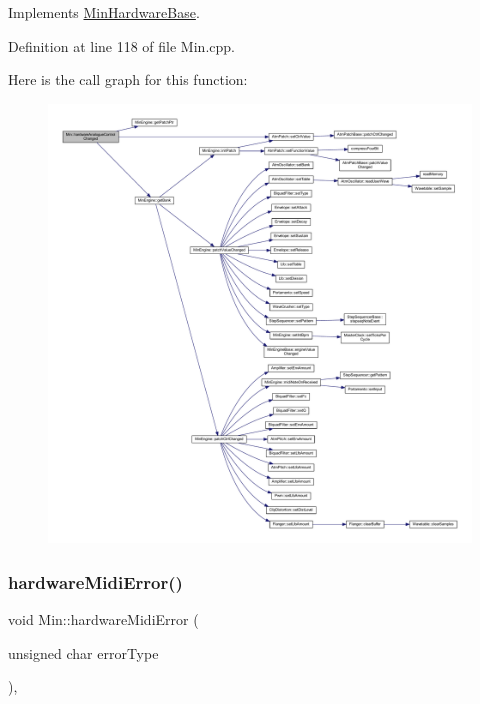 Implements \hyperlink{class_min_hardware_base_a68f71adaa4f8ed5d170fa09820f63871}{Min\+Hardware\+Base}.



Definition at line 118 of file Min.\+cpp.

Here is the call graph for this function\+:
\nopagebreak
\begin{figure}[H]
\begin{center}
\leavevmode
\includegraphics[width=350pt]{class_min_aead3e428133f75538420c1e67c532fa7_cgraph}
\end{center}
\end{figure}
\mbox{\label{class_min_a854b62697ad910d3bb0536fe7fd3d725}} 
\subsubsection{\texorpdfstring{hardware\+Midi\+Error()}{hardwareMidiError()}}
{\footnotesize\ttfamily void Min\+::hardware\+Midi\+Error (\begin{DoxyParamCaption}\item[{unsigned char}]{error\+Type }\end{DoxyParamCaption})\hspace{0.3cm}{\ttfamily [inline]}, {\ttfamily [virtual]}}




